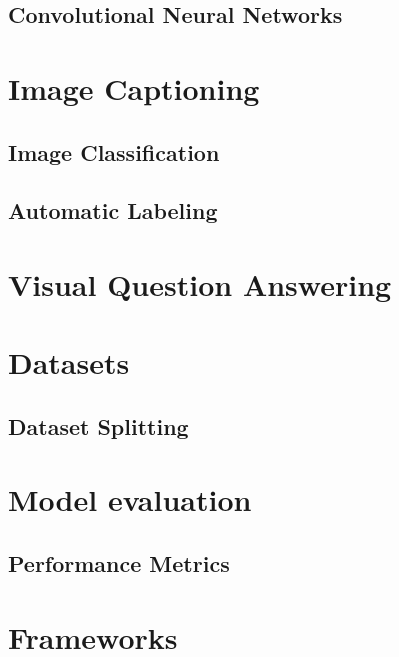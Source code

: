     
    \subsection{Convolutional Neural Networks}



\section{Image Captioning}
 
    \subsection{Image Classification}

    \subsection{Automatic Labeling}



\section{Visual Question Answering}

    

   

\section{Datasets}


    

     

    \subsection{Dataset Splitting} 


\section{Model evaluation}

    \subsection{Performance Metrics}


\section{Frameworks}